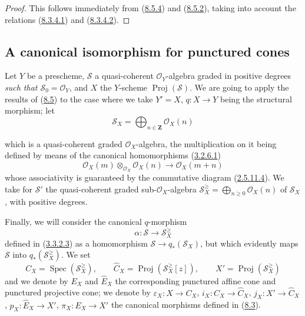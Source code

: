 \begin{proof}
This follows immediately from (\hyperref[II.8.5.4]{8.5.4}) and
(\hyperref[II.8.5.2]{8.5.2}), taking into account the relations
(\hyperref[II.8.3.4.1]{8.3.4.1}) and
(\hyperref[II.8.3.4.2]{8.3.4.2}).
\end{proof}

\subsection{A canonical isomorphism for punctured cones}
\label{subsection:II.8.6}

\begin{env}[8.6.1]
\label{II.8.6.1}
Let $Y$ be a prescheme, $\mathcal{S}$ a quasi-coherent $\mathcal{O}_Y$-algebra
graded in positive degrees \emph{such that
$\mathcal{S}_0=\mathcal{O}_Y$}, and $X$ the $Y$-scheme
$\operatorname{Proj}(\mathcal{S})$. We are going to apply the results of
(\hyperref[subsection:II.8.5]{8.5}) to the case where we take $Y'=X$,
$q:X\to Y$ being the structural morphism; let
\begin{equation}
\label{II.8.6.1.1}
  \mathcal{S}_X=\bigoplus_{n\in\mathbf{Z}}\mathcal{O}_X(n)
\tag{8.6.1.1}
\end{equation}

which is a quasi-coherent graded $\mathcal{O}_X$-algebra, the multiplication
on it being defined by means of the canonical homomorphisms
(\hyperref[II.3.2.6.1]{3.2.6.1})
\[
  \mathcal{O}_X(m)\otimes_{\mathcal{O}_X}\mathcal{O}_X(n)
  \to\mathcal{O}_X(m+n)
\]
whose associativity is guaranteed by the commutative diagram
(\hyperref[II.2.5.11.4]{2.5.11.4}). We take for $\mathcal{S}'$ the
quasi-coherent graded sub-$\mathcal{O}_X$-algebra
$\mathcal{S}_X^{\geq}=\bigoplus_{n\geq0}\mathcal{O}_X(n)$ of
$\mathcal{S}_X$, with positive degrees.

Finally, we will consider the canonical $q$-morphism
\begin{equation}
\label{II.8.6.1.2}
  \alpha:\mathcal{S}\to\mathcal{S}_X^{\geq}
\tag{8.6.1.2}
\end{equation}
defined in (\hyperref[II.3.3.2.3]{3.3.2.3}) as a homomorphism
$\mathcal{S}\to q_*(\mathcal{S}_X)$, but which evidently maps
$\mathcal{S}$ into $q_*(\mathcal{S}_X^{\geq})$. We set
\begin{equation}
\label{II.8.6.1.3}
  C_X=\operatorname{Spec}(\mathcal{S}_X^{\geq}),\qquad
  \widehat{C}_X=\operatorname{Proj}(\mathcal{S}_X^{\geq}[z]),\qquad
  X'=\operatorname{Proj}(\mathcal{S}_X^{\geq})
\tag{8.6.1.3}
\end{equation}
and we denote by $E_X$ and $\widehat{E}_X$ the corresponding punctured affine
cone and punctured projective cone; we denote by
$\varepsilon_X:X\to C_X$, $i_X:C_X\to\widehat{C}_X$,
$j_X:X'\to\widehat{C}_X$, $p_X:\widehat{E}_X\to X'$,
$\pi_X:E_X\to X'$ the canonical morphisms defined in
(\hyperref[subsection:II.8.3]{8.3}).
\end{env}

